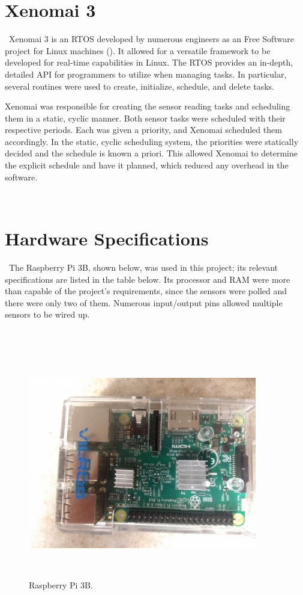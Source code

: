 \documentclass[letterpaper, 12pt]{article}
\begin{document}
\section{Xenomai 3}
~\indent Xenomai 3 is an RTOS developed by numerous engineers as an Free Software project for Linux machines (\cite{xenomai2018}).  It allowed for a versatile framework to be developed for real-time capabilities in Linux.  The RTOS provides an in-depth, detailed API for programmers to utilize when managing tasks.  In particular, several routines were used to create, initialize, schedule, and delete tasks.

\indent Xenomai was responsible for creating the sensor reading tasks and scheduling them in a static, cyclic manner.  Both sensor tasks were scheduled with their respective periods.  Each was given a priority, and Xenomai scheduled them accordingly.  In the static, cyclic scheduling system, the priorities were statically decided and the schedule is known a priori.  This allowed Xenomai to determine the explicit schedule and have it planned, which reduced any overhead in the software.

~\newpage
\section{Hardware Specifications}
~\indent The Raspberry Pi 3B, shown below, was used in this project; its relevant specifications are listed in the table below.  Its processor and RAM were more than capable of the project's requirements, since the sensors were polled and there were only two of them.  Numerous input/output pins allowed multiple sensors to be wired up.

~\newline 
\begin{figure}[H]
	\centering
	\includegraphics[width=10cm,height=10cm,keepaspectratio]{raspberry_pi.jpg}
	\caption[RPi]{Raspberry Pi 3B.}
	\label{fig:rpi}
\end{figure}
\end{document}
